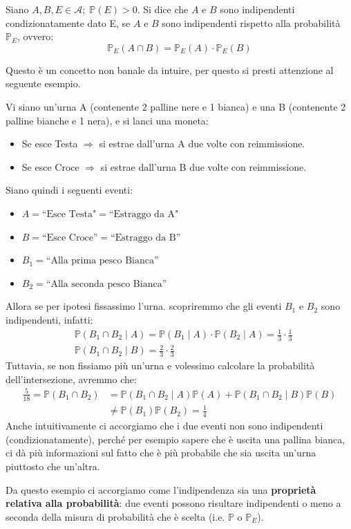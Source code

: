 \begin{definizione}
    Siano $A, B, E \in \mathcal{A};\;\mathbb{P}(E)>0$. Si dice che $A$ e $B$ sono indipendenti condizionatamente dato E, se $A$ e $B$ sono indipendenti rispetto alla probabilità $\mathbb{P}_E$, ovvero:
    \[\mathbb{P}_E(A\cap B) = \mathbb{P}_E(A)\cdot\mathbb{P}_E(B)\]
\end{definizione}
Questo è un concetto non banale da intuire, per questo si presti attenzione al seguente esempio.
\begin{esempio}[\faWarning]
    Vi siano un'urna A (contenente 2 palline nere e 1 bianca) e una B (contenente 2 palline bianche e 1 nera), e si lanci una moneta:
    \begin{itemize}
        \item Se esce Testa $\Rightarrow$ si estrae dall'urna A due volte con reimmissione.
        \item Se esce Croce $\Rightarrow$ si estrae dall'urna B due volte con reimmissione.
    \end{itemize}
    Siano quindi i seguenti eventi:
    \begin{itemize}
        \item $A =\text{``Esce Testa"} =\text{``Estraggo da A"}$ 
        \item $B = \text{``Esce Croce''}=\text{``Estraggo da B''}$
        \item $B_1 = \text{``Alla prima pesco Bianca''}$ 
        \item $B_2 = \text{``Alla seconda pesco Bianca''}$ 
    \end{itemize}
    Allora se per ipotesi fissassimo l'urna. scopriremmo che gli eventi $B_1$ e $B_2$ sono indipendenti, infatti:
    \begin{align*}
        &\mathbb{P}(B_1 \cap B_2\mid A) = \mathbb{P}(B_1\mid A)\cdot \mathbb{P}(B_2\mid A) = \frac{1}{3}\cdot\frac{1}{3}\\
        & \mathbb{P}(B_1 \cap B_2\mid B) = \frac{2}{3}\cdot\frac{2}{3} 
    \end{align*}
    Tuttavia, se non fissiamo più un'urna e volessimo calcolare la probabilità dell'intersezione, avremmo che:
    \begin{align*}
        \frac{5}{18} = \mathbb{P}(B_1 \cap B_2) &= \mathbb{P}(B_1 \cap B_2\mid A)\mathbb{P}(A) + \mathbb{P}(B_1 \cap B_2\mid B)\mathbb{P}(B)\\
        &\neq \mathbb{P}(B_1)\mathbb{P}(B_2)=\frac{1}{4}
    \end{align*}
    Anche intuitivamente ci accorgiamo che i due eventi non sono indipendenti (condizionatamente), perché per esempio sapere che è uscita una pallina bianca, ci dà più informazioni sul fatto che è più probabile che sia uscita un'urna piuttosto che un'altra.
\end{esempio}
\bigskip
\noindent Da questo esempio ci accorgiamo come l'indipendenza sia una \textbf{proprietà relativa alla probabilità}: due eventi possono risultare indipendenti o meno a seconda della misura di probabilità che è scelta (i.e. $\mathbb{P} \text{ o }\mathbb{P}_E$).

